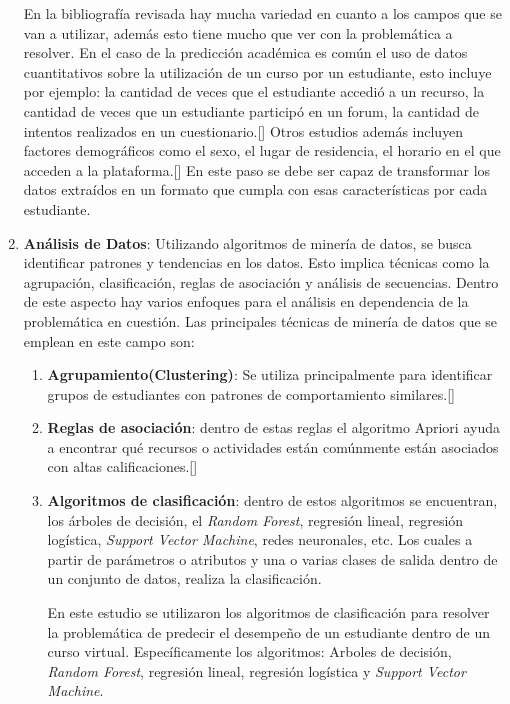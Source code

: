 \begin{enumerate}
    
    En la bibliografía revisada hay mucha variedad en cuanto a los campos que se van a utilizar, además esto tiene mucho que ver con la problemática a resolver. En el caso de la predicción académica es común el uso de datos cuantitativos sobre la utilización de un curso por un estudiante, esto incluye por ejemplo: la cantidad de veces que el estudiante accedió a un recurso, la cantidad de veces que un estudiante participó en un forum, la cantidad de intentos realizados en un cuestionario.[\cite{Rodolfo}] Otros estudios además incluyen factores demográficos como el sexo, el lugar de residencia, el horario en el que acceden a la plataforma.[\cite{Sushil}] En este paso se debe ser capaz de transformar los datos extraídos en un formato que cumpla con esas características por cada estudiante.  

    \item \textbf{Análisis de Datos}: Utilizando algoritmos de minería de datos, se busca identificar patrones y tendencias en los datos. Esto implica técnicas como la agrupación, clasificación, reglas de asociación y análisis de secuencias. Dentro de este aspecto hay varios enfoques para el análisis en dependencia de la problemática en cuestión. Las principales técnicas de minería de datos que se emplean en este campo son:
    \begin{enumerate}
        \item \textbf{Agrupamiento(Clustering)}: Se utiliza principalmente para identificar grupos de estudiantes con patrones de comportamiento similares.[\cite{Romero_tesis}]
        \item \textbf{Reglas de asociación}: dentro de estas reglas el algoritmo Apriori ayuda a encontrar qué recursos o actividades están comúnmente están asociados con altas calificaciones.[\cite{Romero_tesis}]
        \item \textbf{Algoritmos de clasificación}: dentro de estos algoritmos se encuentran, los árboles de decisión, el \textit{Random Forest}, regresión lineal, regresión logística, \textit{Support Vector Machine}, redes neuronales, etc. Los cuales a partir de parámetros o atributos y una o varias clases de salida dentro de un conjunto de datos, realiza la clasificación.  

        En este estudio se utilizaron los algoritmos de clasificación para resolver la problemática de predecir el desempeño de un estudiante dentro de un curso virtual. Específicamente los algoritmos: Arboles de decisión, \textit{Random Forest}, regresión lineal, regresión logística y \textit{Support Vector Machine}.
    \end{enumerate}
		

\end{enumerate}
